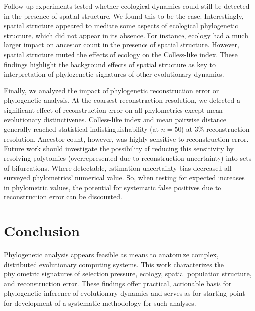 Follow-up experiments tested whether ecological dynamics could still be detected in the presence of spatial structure.
We found this to be the case.
Interestingly, spatial structure appeared to mediate some aspects of ecological phylogenetic structure, which did not appear in its absence.
For instance, ecology had a much larger impact on ancestor count in the presence of spatial structure.
However, spatial structure muted the effects of ecology on the Colless-like index.
These findings highlight the background effects of spatial structure as key to interpretation of phylogenetic signatures of other evolutionary dynamics.

Finally, we analyzed the impact of phylogenetic reconstruction error on phylogenetic analysis.
At the coarsest reconstruction resolution, we detected a significant effect of reconstruction error on all phylometrics except mean evolutionary distinctivenes.
Colless-like index and mean pairwise distance generally reached statistical indistinguishability (at $n=50$) at 3\% reconstruction resolution.
Ancestor count, however, was highly sensitive to reconstruction error.
Future work should investigate the possibility of reducing this sensitivity by resolving polytomies (overrepresented due to reconstruction uncertainty) into sets of bifurcations.
Where detectable, estimation uncertainty bias decreased all surveyed phylometrics' numerical value.
So, when testing for expected increases in phylometric values, the potential for systematic false positives due to reconstruction error can be discounted.

\vspace{-1.5ex}
\section{Conclusion}

Phylogenetic analysis appears feasible as means to anatomize complex, distributed evolutionary computing systems.
This work characterizes the phylometric signatures of selection pressure, ecology, spatial population structure, and reconstruction error.
These findings offer practical, actionable basis for phylogenetic inference of evolutionary dynamics and serves as for starting point for development of a systematic methodology for such analyses.
